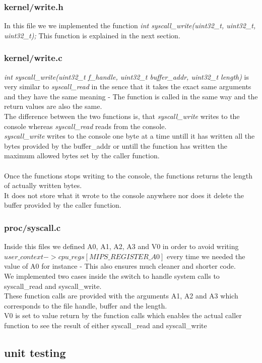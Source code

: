 \documentclass[a4paper,12pt,danish]{report}
\begin{document}
\subsubsection{kernel/write.h}
In this file we we implemented the function \textit{int syscall\_write(uint32\_t, uint32\_t, uint32\_t);}
This function is explained in the next section.
\subsubsection{kernel/write.c}
\textit{int syscall\_write(uint32\_t f\_handle, uint32\_t buffer\_addr, uint32\_t length)} is very similar to \textit{syscall\_read} in the sence that it takes the exact same arguments and they have the same meaning - The function is called in the same way and the return values are also the same.
\\
The difference between the two functions is, that \textit{syscall\_write} writes to the console whereas \textit{syscall\_read} reads from the console.
\\
\textit{syscall\_write} writes to the console one byte at a time untill it has written all the bytes provided by the buffer\_addr or untill the function has written the maximum allowed bytes set by the caller function.
\\
\\
Once the functions stops writing to the console, the functions returns the length of actually written bytes.
\\
It does not store what it wrote to the console anywhere nor does it delete the buffer provided by the caller function.
\subsubsection{proc/syscall.c}
Inside this files we defined A0, A1, A2, A3 and V0 in order to avoid writing \textit{$user\_context->cpu\_regs[MIPS\_REGISTER\_A0]$} every time we needed the value of A0 for instance - This also ensures much cleaner and shorter code.
\\
We implemented two cases inside the switch to handle system calls to syscall\_read and syscall\_write.
\\
These function calls are provided with the arguments A1, A2 and A3 which corresponds to the file handle, buffer and the length.\\
V0 is set to value return by the function calls which enables the actual caller function to see the result of either syscall\_read and syscall\_write
\subsection{unit testing}
\end{document}
